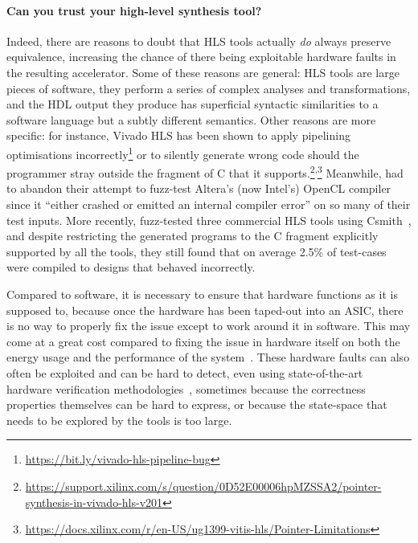 
\paragraph{Can you trust your high-level synthesis tool?}

Indeed, there are reasons to doubt that \gls{HLS} tools actually \emph{do}
always preserve equivalence, increasing the chance of there being exploitable
hardware faults in the resulting accelerator.  Some of these reasons are
general: \gls{HLS} tools are large pieces of software, they perform a series of
complex analyses and transformations, and the \gls{HDL} output they produce has
superficial syntactic similarities to a software language but a subtly different
semantics.  Other reasons are more specific: for instance, Vivado HLS has been
shown to apply pipelining optimisations
incorrectly\footnote{\url{https://bit.ly/vivado-hls-pipeline-bug}} or to silently generate wrong code should the programmer
stray outside the fragment of C that it
supports.\footnote{\url{https://support.xilinx.com/s/question/0D52E00006hpMZSSA2/pointer-synthesis-in-vivado-hls-v201}}\textsuperscript{,}\footnote{\url{https://docs.xilinx.com/r/en-US/ug1399-vitis-hls/Pointer-Limitations}}
Meanwhile, \textcite{lidbury15_many_core_compil_fuzzin} had to abandon their
attempt to fuzz-test Altera's (now Intel's) OpenCL compiler since it
\enquote{either crashed or emitted an internal compiler error} on so many of
their test inputs.  More recently,
\textcite{herklotz21_empir_study_reliab_high_level_synth_tools} fuzz-tested
three commercial \gls{HLS} tools using
Csmith~\cite{yang11_findin_under_bugs_c_compil}, and despite restricting the
generated programs to the C fragment explicitly supported by all the tools, they
still found that on average 2.5\% of test-cases were compiled to designs that
behaved incorrectly.

Compared to software, it is necessary to ensure that hardware functions as it is
supposed to, because once the hardware has been taped-out into an \gls{ASIC},
there is no way to properly fix the issue except to work around it in software.
This may come at a great cost compared to fixing the issue in hardware itself on
both the energy usage and the performance of the
system~\cite{herzog21_price_meltd_spect,bowen20_perfor_cost_softw_based_secur_mitig}.
These hardware faults can also often be exploited and can be hard to detect,
even using state-of-the-art hardware verification
methodologies~\cite{dessouky19_hardf}, sometimes because the correctness
properties themselves can be hard to express, or because the state-space that
needs to be explored by the tools is too large.

